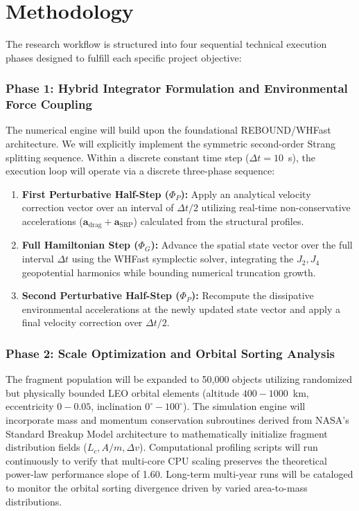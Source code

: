 \documentclass[11pt,letterpaper]{article}
\begin{document}
\section{Methodology}
The research workflow is structured into four sequential technical execution phases designed to fulfill each specific project objective:

\subsubsection*{Phase 1: Hybrid Integrator Formulation and Environmental Force Coupling}
The numerical engine will build upon the foundational REBOUND/WHFast architecture. We will explicitly implement the symmetric second-order Strang splitting sequence. Within a discrete constant time step ($\Delta t = 10$~s), the execution loop will operate via a discrete three-phase sequence:
\begin{enumerate}
    \item \textbf{First Perturbative Half-Step ($\Phi_P$):} Apply an analytical velocity correction vector over an interval of $\Delta t/2$ utilizing real-time non-conservative accelerations ($\mathbf{a}_{\text{drag}} + \mathbf{a}_{\text{SRP}}$) calculated from the structural profiles.
    \item \textbf{Full Hamiltonian Step ($\Phi_G$):} Advance the spatial state vector over the full interval $\Delta t$ using the WHFast symplectic solver, integrating the $J_2, J_4$ geopotential harmonics while bounding numerical truncation growth.
    \item \textbf{Second Perturbative Half-Step ($\Phi_P$):} Recompute the dissipative environmental accelerations at the newly updated state vector and apply a final velocity correction over $\Delta t/2$.
\end{enumerate}

\subsubsection*{Phase 2: Scale Optimization and Orbital Sorting Analysis}
The fragment population will be expanded to 50,000 objects utilizing randomized but physically bounded LEO orbital elements (altitude $400 - 1000$~km, eccentricity $0 - 0.05$, inclination $0^\circ - 100^\circ$). The simulation engine will incorporate mass and momentum conservation subroutines derived from NASA's Standard Breakup Model architecture to mathematically initialize fragment distribution fields ($L_c, A/m, \Delta v$). Computational profiling scripts will run continuously to verify that multi-core CPU scaling preserves the theoretical power-law performance slope of 1.60. Long-term multi-year runs will be cataloged to monitor the orbital sorting divergence driven by varied area-to-mass distributions.
\end{document}
